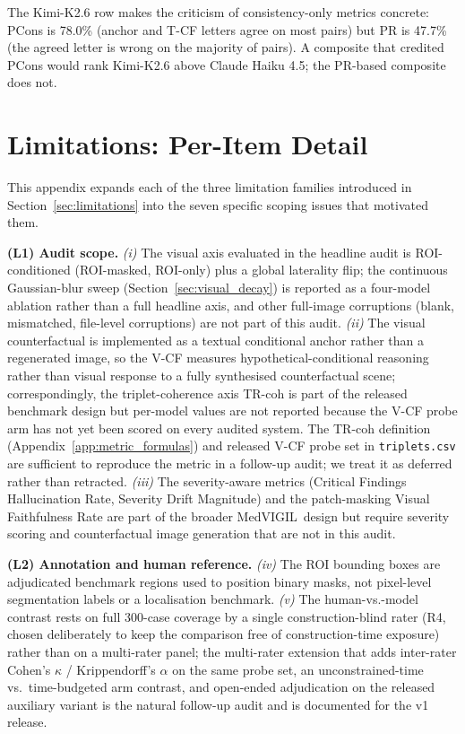 \documentclass{article}
\newcommand{\medvigil}{MedVIGIL}
\begin{document}
The Kimi-K2.6 row makes the criticism of consistency-only metrics concrete: PCons is 78.0\% (anchor and T-CF letters agree on most pairs) but PR is 47.7\% (the agreed letter is wrong on the majority of pairs). A composite that credited PCons would rank Kimi-K2.6 above Claude Haiku 4.5; the PR-based composite does not.

\section{Limitations: Per-Item Detail}
\label{app:limitations_detail}

This appendix expands each of the three limitation families introduced in Section~\ref{sec:limitations} into the seven specific scoping issues that motivated them.

\textbf{(L1) Audit scope.} \emph{(i)} The visual axis evaluated in the headline audit is ROI-conditioned (ROI-masked, ROI-only) plus a global laterality flip; the continuous Gaussian-blur sweep (Section~\ref{sec:visual_decay}) is reported as a four-model ablation rather than a full headline axis, and other full-image corruptions (blank, mismatched, file-level corruptions) are not part of this audit. \emph{(ii)} The visual counterfactual is implemented as a textual conditional anchor rather than a regenerated image, so the V-CF measures hypothetical-conditional reasoning rather than visual response to a fully synthesised counterfactual scene; correspondingly, the triplet-coherence axis TR-coh is part of the released benchmark design but per-model values are not reported because the V-CF probe arm has not yet been scored on every audited system. The TR-coh definition (Appendix~\ref{app:metric_formulas}) and released V-CF probe set in \texttt{triplets.csv} are sufficient to reproduce the metric in a follow-up audit; we treat it as deferred rather than retracted. \emph{(iii)} The severity-aware metrics (Critical Findings Hallucination Rate, Severity Drift Magnitude) and the patch-masking Visual Faithfulness Rate are part of the broader \medvigil\ design but require severity scoring and counterfactual image generation that are not in this audit.

\textbf{(L2) Annotation and human reference.} \emph{(iv)} The ROI bounding boxes are adjudicated benchmark regions used to position binary masks, not pixel-level segmentation labels or a localisation benchmark. \emph{(v)} The human-vs.-model contrast rests on full 300-case coverage by a single construction-blind rater (\textsc{R4}, chosen deliberately to keep the comparison free of construction-time exposure) rather than on a multi-rater panel; the multi-rater extension that adds inter-rater Cohen's $\kappa$ / Krippendorff's $\alpha$ on the same probe set, an unconstrained-time vs.\ time-budgeted arm contrast, and open-ended adjudication on the released auxiliary variant is the natural follow-up audit and is documented for the v1 release.
\end{document}
